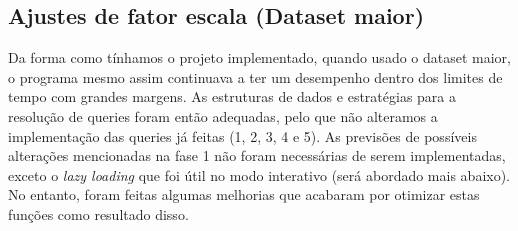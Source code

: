 \documentclass{article}
\begin{document}
        \subsection{Ajustes de fator escala (Dataset maior)}
            Da forma como tínhamos o projeto implementado, quando 
            usado o dataset maior, o programa mesmo assim continuava
            a ter um desempenho dentro dos limites de tempo com grandes 
            margens. As estruturas de dados e estratégias para
            a resolução de queries foram então adequadas, pelo que
            não alteramos a implementação das queries já feitas
            (1, 2, 3, 4 e 5). As previsões de possíveis alterações
            mencionadas na fase 1 não foram necessárias de serem
            implementadas, exceto o \emph{lazy loading} que foi
            útil no modo interativo (será abordado mais abaixo).
            No entanto, foram feitas algumas melhorias que acabaram
            por otimizar estas funções como resultado disso.
    \pagebreak
\end{document}
